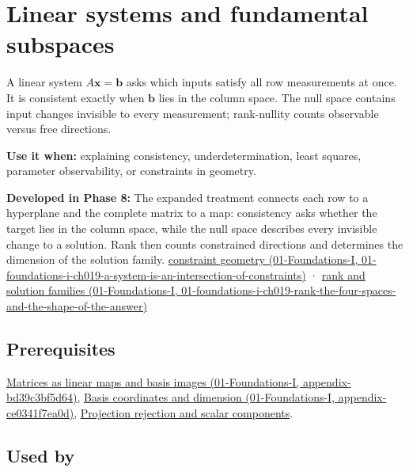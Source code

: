 \hypertarget{appendix-8572a4a060c1}{}
\section{Linear systems and fundamental subspaces}\label{appendix-8572a4a060c1-linear-systems-and-fundamental-subspaces}

A linear system \(A\mathbf x=\mathbf b\) asks which inputs satisfy all row measurements at once. It is consistent exactly when \(\mathbf b\) lies in the column space. The null space contains input changes invisible to every measurement; rank-nullity counts observable versus free directions.

\textbf{Use it when:} explaining consistency, underdetermination, least squares, parameter observability, or constraints in geometry.

\textbf{Developed in Phase 8:} The expanded treatment connects each row to a hyperplane and the complete matrix to a map: consistency asks whether the target lies in the column space, while the null space describes every invisible change to a solution. Rank then counts constrained directions and determines the dimension of the solution family. \href{../01-Foundations-I/main.pdf\#nameddest=01-foundations-i-ch019-a-system-is-an-intersection-of-constraints}{constraint geometry (01-Foundations-I, 01-foundations-i-ch019-a-system-is-an-intersection-of-constraints)} · \href{../01-Foundations-I/main.pdf\#nameddest=01-foundations-i-ch019-rank-the-four-spaces-and-the-shape-of-the-answer}{rank and solution families (01-Foundations-I, 01-foundations-i-ch019-rank-the-four-spaces-and-the-shape-of-the-answer)}

\subsection{Prerequisites}\label{appendix-8572a4a060c1-prerequisites}

\href{../01-Foundations-I/main.pdf\#nameddest=appendix-bd39c3bf5d64}{Matrices as linear maps and basis images (01-Foundations-I, appendix-bd39c3bf5d64)}, \href{../01-Foundations-I/main.pdf\#nameddest=appendix-ce0341f7ea0d}{Basis coordinates and dimension (01-Foundations-I, appendix-ce0341f7ea0d)}, \hyperref[appendix-505a502c372a]{Projection rejection and scalar components}.

\subsection{Used by}\label{appendix-8572a4a060c1-used-by}

